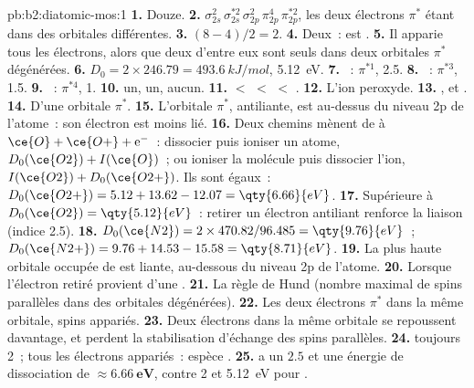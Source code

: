 \begin{solution}{pb:b2:diatomic-mos:1}
\textbf{1.} Douze.
\textbf{2.} $\sigma_{2s}^2\,\sigma_{2s}^{*2}\,\sigma_{2p}^2\,\pi_{2p}^4\,\pi_{2p}^{*2}$, les deux électrons $\pi^*$
étant dans des orbitales différentes.
\textbf{3.} $(8 - 4)/2 = 2$.
\textbf{4.} Deux~:  est .
\textbf{5.} Il apparie tous les électrons, alors que deux d'entre eux sont seuls dans deux orbitales
$\pi^*$ dégénérées.
\textbf{6.} $D_0 = 2 \times 246.79 = \qty{493.6}{kJ/mol}$, \qty{5.12}{eV}.
\textbf{7.} ~: $\pi^{*1}$,  2.5.
\textbf{8.} ~: $\pi^{*3}$,  1.5.
\textbf{9.} ~: $\pi^{*4}$,  1.
\textbf{10.}  un,  un,  aucun.
\textbf{11.}  $<$  $<$  $<$ .
\textbf{12.} L'ion peroxyde.
\textbf{13.} ,  et .
\textbf{14.} D'une orbitale $\pi^*$.
\textbf{15.} L'orbitale $\pi^*$, antiliante, est au-dessus du niveau 2p de l'atome~: son
électron est moins lié.
\textbf{16.} Deux chemins mènent de  à $\ce{O} + \ce{O+} + \mathrm e^-$~: dissocier puis
ioniser un atome, $D_0(\ce{O2}) + I(\ce{O})$~; ou ioniser la molécule puis dissocier l'ion,
$I(\ce{O2}) + D_0(\ce{O2+})$. Ils sont égaux~: $D_0(\ce{O2+}) = 5.12 + 13.62 - 12.07 = \qty{6.66}{eV}$.
\textbf{17.} Supérieure à $D_0(\ce{O2}) = \qty{5.12}{eV}$~: retirer un électron antiliant
renforce la liaison (indice 2.5).
\textbf{18.} $D_0(\ce{N2}) = 2 \times 470.82/96.485 = \qty{9.76}{eV}$~; $D_0(\ce{N2+}) = 9.76 +
14.53 - 15.58 = \qty{8.71}{eV}$.
\textbf{19.} La plus haute orbitale occupée de  est liante, au-dessous du niveau 2p de
l'atome.
\textbf{20.} Lorsque l'électron retiré provient d'une .
\textbf{21.} La règle de Hund (nombre maximal de spins parallèles dans des orbitales dégénérées).
\textbf{22.} Les deux électrons $\pi^*$ dans la même orbitale, spins appariés.
\textbf{23.} Deux électrons dans la même orbitale se repoussent davantage, et perdent la
stabilisation d'échange des spins parallèles.
\textbf{24.}  toujours 2~; tous les électrons appariés~: espèce .
\textbf{25.}  a un  $\boldsymbol{2.5}$ et une énergie de dissociation de
$\boldsymbol{\approx \qty{6.66}{eV}}$, contre 2 et \qty{5.12}{eV} pour .
\end{solution}

